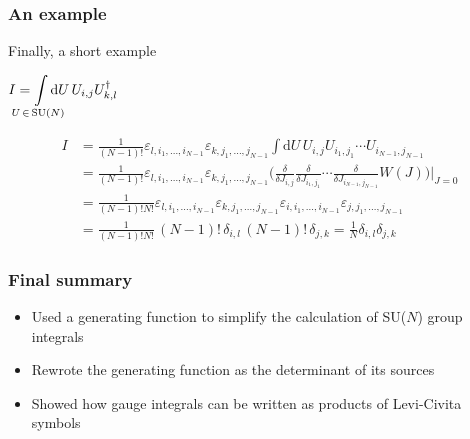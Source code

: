 \documentclass[10pt,a4paper,usenames,dvipsnames]{beamer}
\begin{document}
\begin{frame}
  \frametitle{An example}

  Finally, a short example

  \begin{block}{}
    \centering
    $I = \displaystyle\int\limits_{\mathclap{U \, \in \, \mathrm{SU}(N)}} \mathrm{d} U \, U_{i,j} U_{k,l}^{\dagger}$ 
  \end{block}

  \vspace*{-1em}

  \begin{align*}
    I &= \frac{1}{(N-1)!} \varepsilon_{l,i_1,\dots,i_{N-1}}\varepsilon_{k,j_1,\dots,j_{N-1}} \int \mathrm{d} U \, U_{i,j} U_{i_1,j_1} \cdots U_{i_{N-1},j_{N-1}} \\
    &= \frac{1}{(N-1)!} \varepsilon_{l,i_1,\dots,i_{N-1}}\varepsilon_{k,j_1,\dots,j_{N-1}} \bigg( \frac{\delta}{\delta J_{i,j}} \frac{\delta}{\delta
      J_{i_1,j_1}} \cdots \frac{\delta}{\delta J_{i_{N-1},j_{N-1}}} W(J) \bigg) \bigg|_{J=0} \\
      &= \frac{1}{(N-1)!N!} \varepsilon_{l,i_1,\dots,i_{N-1}}\varepsilon_{k,j_1,\dots,j_{N-1}} \varepsilon_{i,i_1,\dots,i_{N-1}} \varepsilon_{j,j_1,\dots,j_{N-1}} \\
      &= \frac{1}{(N-1)!N!} \, (N-1)! \, \delta_{i,l} \, (N-1)! \, \delta_{j,k} = \frac{1}{N} \delta_{i,l} \delta_{j,k}
  \end{align*}


\end{frame}

\begin{frame}
  \frametitle{Final summary}

  \begin{itemize}
    \item Used a generating function to simplify the calculation of SU($N$) group integrals
    \item Rewrote the generating function as the determinant of its sources
    \item Showed how gauge integrals can be written as products of Levi-Civita symbols
  \end{itemize}

\end{frame}
\end{document}
